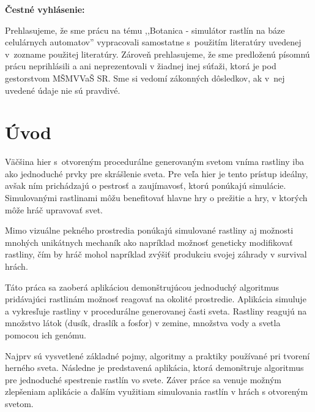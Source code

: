 \documentclass[12pt]{article}
\def\nazovprace{Botanica - simulátor rastlín na báze celulárnych automatov}
\begin{document}
\setcounter{page}{3}


\thispagestyle{empty}

\null
\vfill

\noindent
\textbf{Čestné vyhlásenie:}

Prehlasujeme, že sme prácu na tému
,,\nazovprace''
vypracovali samostatne s~použitím literatúry uvedenej v~zozname použitej literatúry.
Zároveň prehlasujeme, že sme predloženú písomnú prácu neprihlásili a ani neprezentovali
v žiadnej inej súťaži, ktorá je pod gestorstvom MŠMVVaŠ SR. Sme si vedomí zákonných dôsledkov,
ak v~nej uvedené údaje nie sú pravdivé.

\vspace{5cm}

\newpage


%
%

% 
% 
% 
% 


\thispagestyle{empty}
\tableofcontents

%
%

\section*{Úvod}

Väčšina hier s~otvoreným procedurálne generovaným svetom vníma rastliny iba ako
jednoduché prvky pre skrášlenie sveta. Pre veľa hier je tento prístup ideálny,
avšak ním prichádzajú o pestrosť a zaujímavosť, ktorú ponúkajú simulácie.
Simulovanými rastlinami môžu benefitovať hlavne hry o prežitie a hry, v ktorých
môže hráč upravovať svet.

Mimo vizuálne pekného prostredia ponúkajú simulované rastliny aj možnosti
mnohých unikátnych mechaník ako napríklad možnosť geneticky
modifikovať rastliny, čím by hráč mohol napríklad zvýšiť produkciu svojej záhrady
v survival hrách.

Táto práca sa zaoberá aplikáciou demonštrujúcou jednoduchý algoritmus
pridávajúci rastlinám možnosť reagovať na okolité prostredie. Aplikácia
simuluje a vykresľuje rastliny v procedurálne generovanej časti sveta.
Rastliny reagujú na množstvo látok (dusík, draslík a fosfor) v zemine,
množstva vody a svetla pomocou ich genómu.

Najprv sú vysvetlené základné pojmy, algoritmy a praktiky používané pri tvorení
herného sveta. Následne je predstavená aplikácia, ktorá demonštruje algoritmus
pre jednoduché spestrenie rastlín vo svete. Záver práce sa venuje možným
zlepšeniam aplikácie a ďalším využitiam simulovania rastlín v hrách
s otvoreným svetom.
\end{document}
